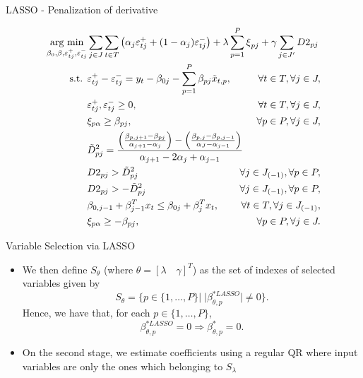 \begin{frame}{LASSO - Penalization of derivative}

\tiny

\begin{eqnarray}
\underset{\beta_{0},\beta,\varepsilon_{t j}^{+},\varepsilon_{t j}^{-}}{\text{arg min}} & \sum_{j \in J} \sum_{t \in T}\left(\alpha_j \varepsilon_{t j}^{+}+(1-\alpha_j)\varepsilon_{t j}^{-}\right)+\lambda\sum_{p=1}^{P}\mbox{\ensuremath{\xi}}_{p j} + \gamma \sum_{j \in J'} D2_{pj} \span \label{eq:obj-lasso} \\
\mbox{s.t. } & \varepsilon_{t j}^{+}-\varepsilon_{t j}^{-}= y_{t}-\beta_{0 j}-\sum_{p=1}^{P}\beta_{p j}\tilde x_{t,p},&\forall t\in T, \forall j \in J, \\
& \varepsilon_{t j}^{+},\varepsilon_{t j}^{-}\geq0,&\forall t \in T, \forall j \in J,\\
& \xi_{p\alpha}\geq\beta_{p j},&\forall p\in P, \forall j \in J,  \label{l1-qar-3}
\\
& \tilde{D}_{pj}^{2}=\frac{\left(\frac{\beta_{p,j+1}-\beta_{pj}}{\alpha_{j+1}-\alpha_{j}}\right)-\left(\frac{\beta_{p,j}-\beta_{p,j-1}}{\alpha_{J}-\alpha_{j-1}}\right)}{\alpha_{j+1}-2\alpha_{j}+\alpha_{j-1}} \span\\
& D2_{pj} >  \tilde D_{pj}^{2} &  \forall j \in J_{(-1)}, \forall p\in P, \\
& D2_{pj} >  - \tilde D_{pj}^{2} &  \forall j \in J_{(-1)}, \forall p\in P,\\
& \beta_{0,j-1} + \beta_{j-1}^T x_{t} \leq \beta_{0j} + \beta_{j}^T x_{t}, & \forall t \in T, \forall j \in J_{(-1)},\\
& \xi_{p\alpha}\geq-\beta_{p j},&\forall p\in P, \forall j \in J. 
\end{eqnarray}

\end{frame}

\begin{frame}{Variable Selection via LASSO}

\begin{itemize}
\item
  We then define \(S_\theta\) (where
  \(\theta = [\lambda \quad \gamma]^T\)) as the set of indexes of
  selected variables given by \[
  S_{\theta} = \{ p \in \{ 1,\dots,P \} | \; |\beta^{*LASSO}_{\theta,p}| \neq 0  \}.
  \] Hence, we have that, for each \(p \in \{ 1,\dots,P \}\),
  \[\beta^{*LASSO}_{\theta,p} = 0 \Longrightarrow \beta^{*}_{\theta,p} = 0.\]
\item
  On the second stage, we estimate coefficients using a regular QR where
  input variables are only the ones which belonging to \(S_\lambda\)
\end{itemize}

\end{frame}

